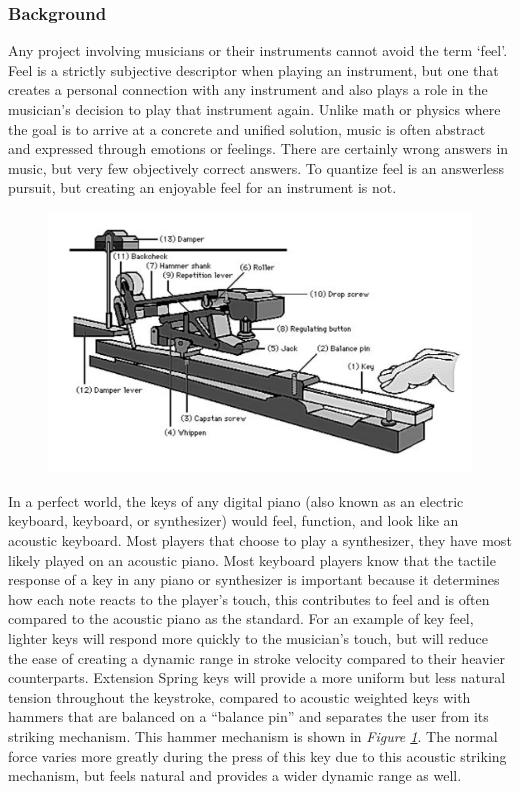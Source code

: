 \subsubsection{Background}

Any project involving musicians or their instruments cannot avoid the term ‘feel’. Feel is a strictly subjective descriptor when playing an instrument, but one that creates a personal connection with any instrument and also plays a role in the musician’s decision to play that instrument again. Unlike math or physics where the goal is to arrive at a concrete and unified solution, music is often abstract and expressed through emotions or feelings. There are certainly wrong answers in music, but very few objectively correct answers. To quantize feel is an answerless pursuit, but creating an enjoyable feel for an instrument is not.

\begin{figure}[h!]
  \centering
  \includegraphics[width=\linewidth]{image/KeyMechanism.png}
  \caption{}
  \label{fig:key_mechanism}
\end{figure}

In a perfect world, the keys of any digital piano (also known as an electric keyboard, keyboard, or synthesizer) would feel, function, and look like an acoustic keyboard. Most players that choose to play a synthesizer, they have most likely played on an acoustic piano. Most keyboard players know that the tactile response of a key in any piano or synthesizer is important because it determines how each note reacts to the player’s touch, this contributes to feel and is often compared to the acoustic piano as the standard. For an example of key feel, lighter keys will respond more quickly to the musician's touch, but will reduce the ease of creating a dynamic range in stroke velocity compared to their heavier counterparts. Extension Spring keys will provide a more uniform but less natural tension throughout the keystroke, compared to acoustic weighted keys with hammers that are balanced on a “balance pin” and separates the user from its striking mechanism. This hammer mechanism is shown in \textit{Figure \ref{fig:key_mechanism}}. The normal force varies more greatly during the press of this key due to this acoustic striking mechanism, but feels natural and provides a wider dynamic range as well.

